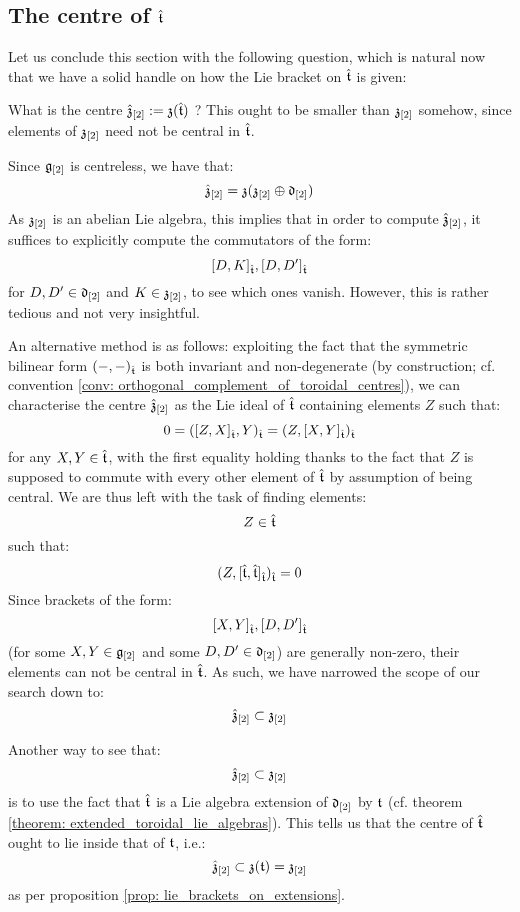     \subsection{The centre of \texorpdfstring{$\hat{\mathfrak{t}}$}{}}
        Let us conclude this section with the following question, which is natural now that we have a solid handle on how the Lie bracket on $\hat{\mathfrak{t}}$ is given:
        \begin{question}
            What is the centre $\hat{\mathfrak{z}}_{[2]} := \mathfrak{z}( \hat{\mathfrak{t}} )$ ? This ought to be smaller than $\mathfrak{z}_{[2]}$ somehow, since elements of $\mathfrak{z}_{[2]}$ need not be central in $\hat{\mathfrak{t}}$. 
        \end{question}
        \begin{remark}
            Since $\mathfrak{g}_{[2]}$ is centreless, we have that:
                $$\hat{\mathfrak{z}}_{[2]} = \mathfrak{z}( \mathfrak{z}_{[2]} \oplus \mathfrak{d}_{[2]} )$$
            As $\mathfrak{z}_{[2]}$ is an abelian Lie algebra, this implies that in order to compute $\hat{\mathfrak{z}}_{[2]}$, it suffices to explicitly compute the commutators of the form:
                $$[D, K]_{\hat{\mathfrak{t}}}, [D, D']_{\hat{\mathfrak{t}}}$$
            for $D, D' \in \mathfrak{d}_{[2]}$ and $K \in \mathfrak{z}_{[2]}$, to see which ones vanish. However, this is rather tedious and not very insightful.
            
            An alternative method is as follows: exploiting the fact that the symmetric bilinear form $(-, -)_{\hat{\mathfrak{t}}}$ is both invariant and non-degenerate (by construction; cf. convention \ref{conv: orthogonal_complement_of_toroidal_centres}), we can characterise the centre $\hat{\mathfrak{z}}_{[2]}$ as the Lie ideal of $\hat{\mathfrak{t}}$ containing elements $Z$ such that:
                $$0 = ([Z, X]_{\hat{\mathfrak{t}}}, Y)_{\hat{\mathfrak{t}}} = (Z, [X, Y]_{\hat{\mathfrak{t}}})_{\hat{\mathfrak{t}}}$$
            for any $X, Y \in \hat{\mathfrak{t}}$, with the first equality holding thanks to the fact that $Z$ is supposed to commute with every other element of $\hat{\mathfrak{t}}$ by assumption of being central. We are thus left with the task of finding elements:
                $$Z \in \hat{\mathfrak{t}}$$
            such that:
                $$(Z, [\hat{\mathfrak{t}}, \hat{\mathfrak{t}}]_{\hat{\mathfrak{t}}})_{\hat{\mathfrak{t}}} = 0$$
            Since brackets of the form:
                $$[X, Y]_{\hat{\mathfrak{t}}}, [D, D']_{\hat{\mathfrak{t}}}$$
            (for some $X, Y \in \mathfrak{g}_{[2]}$ and some $D, D' \in \mathfrak{d}_{[2]}$) are generally non-zero, their elements can not be central in $\hat{\mathfrak{t}}$. As such, we have narrowed the scope of our search down to:
                $$\hat{\mathfrak{z}}_{[2]} \subset \mathfrak{z}_{[2]}$$

            Another way to see that:
                $$\hat{\mathfrak{z}}_{[2]} \subset \mathfrak{z}_{[2]}$$
            is to use the fact that $\hat{\mathfrak{t}}$ is a Lie algebra extension of $\mathfrak{d}_{[2]}$ by $\mathfrak{t}$ (cf. theorem \ref{theorem: extended_toroidal_lie_algebras}). This tells us that the centre of $\hat{\mathfrak{t}}$ ought to lie inside that of $\mathfrak{t}$, i.e.:
                $$\hat{\mathfrak{z}}_{[2]} \subset \mathfrak{z}(\mathfrak{t}) = \mathfrak{z}_{[2]}$$
            as per proposition \ref{prop: lie_brackets_on_extensions}.
        \end{remark}
